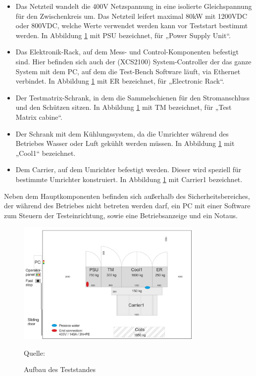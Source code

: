 \begin{itemize}

\item Das Netzteil wandelt die 400V Netzspannung in eine isolierte Gleichspannung für den Zwischenkreis um.
Das Netzteil leifert maximal 80kW mit 1200VDC oder 800VDC, welche Werte verwendet werden kann vor Teststart bestimmt werden.
In Abbildung \ref{fig:1. Aufbau des Teststandes} mit PSU bezeichnet, für „Power Supply Unit“.
\item Das Elektronik-Rack, auf dem Mess- und Control-Komponenten befestigt sind.
Hier befinden sich auch der (XCS2100) System-Controller der das ganze System mit dem PC, auf dem die Test-Bench Software läuft, via Ethernet verbindet.
In Abbildung \ref{fig:1. Aufbau des Teststandes} mit ER bezeichnet, für „Electronic Rack“.
\item Der Testmatrix-Schrank, in dem die Sammelschienen für den Stromanschluss und den Schützen sitzen.
In Abbildung \ref{fig:1. Aufbau des Teststandes} mit TM bezeichnet, für „Test Matrix cabine“.
\item Der Schrank mit dem Kühlungssystem, da die Umrichter während des Betriebes Wasser oder Luft gekühlt werden müssen.
In Abbildung \ref{fig:1. Aufbau des Teststandes} mit „Cool1“ bezeichnet.
\item Dem Carrier, auf dem Umrichter befestigt werden.
Dieser wird speziell für bestimmte Umrichter konstruiert.
In Abbildung \ref{fig:1. Aufbau des Teststandes} mit Carrier1 bezeichnet.

\end{itemize}

Neben dem Hauptkomponenten befinden sich außerhalb des Sicherheitsbereiches, der während des Betriebes nicht betreten werden darf,
ein PC mit einer Software zum Steuern der Testeinrichtung, sowie eine Betriebsanzeige und ein Notaus. \cite*{Main_Manuel_USTB2018}

\begin{figure}[h]
    \centering
    \includegraphics[width=0.8\textwidth]{Grafiken/Test Cabin.jpg}
    \caption{Aufbau des Teststandes}
    \label{fig:1. Aufbau des Teststandes}
    {Quelle: \cite*[7]{Main_Manuel_USTB2018}}
\end{figure}


